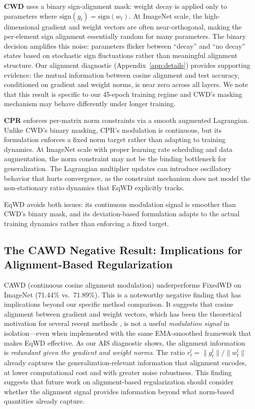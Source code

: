 \documentclass{article}
\begin{document}
\textbf{CWD} uses a binary sign-alignment mask: weight decay is applied
only to parameters where $\text{sign}(g_t) = \text{sign}(w_t)$. At
ImageNet scale, the high-dimensional gradient and weight vectors are
often near-orthogonal, making the per-element sign alignment essentially
random for many parameters. The binary decision amplifies this noise:
parameters flicker between ``decay'' and ``no decay'' states based on
stochastic sign fluctuations rather than meaningful alignment structure.
Our alignment diagnostic (Appendix~\ref{app:details}) provides supporting evidence: the
mutual information between cosine alignment and test accuracy,
conditioned on gradient and weight norms, is near zero across all
layers. We note that this result is specific to our 45-epoch training
regime and CWD's masking mechanism may behave differently under longer
training.

\textbf{CPR} enforces per-matrix norm constraints via a smooth augmented
Lagrangian. Unlike CWD's binary masking, CPR's modulation is continuous,
but its formulation enforces a fixed norm target rather than adapting to
training dynamics. At ImageNet scale with proper learning rate
scheduling and data augmentation, the norm constraint may not be the
binding bottleneck for generalization. The Lagrangian multiplier updates can introduce oscillatory behavior that
hurts convergence, as the constraint mechanism does not model the
non-stationary ratio dynamics that EqWD explicitly tracks.

EqWD avoids both issues: its continuous modulation signal is smoother
than CWD's binary mask, and its deviation-based formulation adapts to
the actual training dynamics rather than enforcing a fixed target.

\subsection{The CAWD Negative Result: Implications for Alignment-Based Regularization}
\label{sec:cawd}

CAWD (continuous cosine alignment modulation) underperforms FixedWD on
ImageNet (71.44\% vs.~71.89\%). This is a noteworthy negative finding
that has implications beyond our specific method comparison. It suggests
that cosine alignment between gradient and weight vectors, which has
been the theoretical motivation for several recent methods
\citep{chen2026cwd, sun2025cvpr}, is not a useful \emph{modulation
signal} in isolation---even when implemented with the same EMA-smoothed
framework that makes EqWD effective. As our AIS diagnostic shows, the
alignment information is \emph{redundant given the gradient and weight
norms}. The ratio $r_t^l = \|g_t^l\| / \|w_t^l\|$ already captures the
generalization-relevant information that alignment encodes, at lower
computational cost and with greater noise robustness. This finding
suggests that future work on alignment-based regularization should
consider whether the alignment signal provides information beyond what
norm-based quantities already capture.
\end{document}
